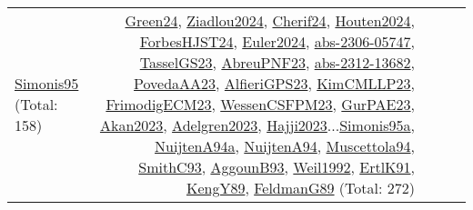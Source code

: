 {\begin{longtable}{p{3cm}r>{\raggedright\arraybackslash}p{6cm}>{\raggedright\arraybackslash}p{6cm}>{\raggedright\arraybackslash}p{8cm}}
\hyperref[detail:Simonis95]{Simonis95} (Total: 158) & \hyperref[detail:Green24]{Green24}, \hyperref[detail:Ziadlou2024]{Ziadlou2024}, \hyperref[detail:Cherif24]{Cherif24}, \hyperref[detail:Houten2024]{Houten2024}, \hyperref[detail:ForbesHJST24]{ForbesHJST24}, \hyperref[detail:Euler2024]{Euler2024}, \hyperref[detail:abs-2306-05747]{abs-2306-05747}, \hyperref[detail:TasselGS23]{TasselGS23}, \hyperref[detail:AbreuPNF23]{AbreuPNF23}, \hyperref[detail:abs-2312-13682]{abs-2312-13682}, \hyperref[detail:PovedaAA23]{PovedaAA23}, \hyperref[detail:AlfieriGPS23]{AlfieriGPS23}, \hyperref[detail:KimCMLLP23]{KimCMLLP23}, \hyperref[detail:FrimodigECM23]{FrimodigECM23}, \hyperref[detail:WessenCSFPM23]{WessenCSFPM23}, \hyperref[detail:GurPAE23]{GurPAE23}, \hyperref[detail:Akan2023]{Akan2023}, \hyperref[detail:Adelgren2023]{Adelgren2023}, \hyperref[detail:Hajji2023]{Hajji2023}...\hyperref[detail:Simonis95a]{Simonis95a}, \hyperref[detail:NuijtenA94a]{NuijtenA94a}, \hyperref[detail:NuijtenA94]{NuijtenA94}, \hyperref[detail:Muscettola94]{Muscettola94}, \hyperref[detail:SmithC93]{SmithC93}, \hyperref[detail:AggounB93]{AggounB93}, \hyperref[detail:Weil1992]{Weil1992}, \hyperref[detail:ErtlK91]{ErtlK91}, \hyperref[detail:KengY89]{KengY89}, \hyperref[detail:FeldmanG89]{FeldmanG89} (Total: 272)\\
\end{longtable}
}

\clearpage

